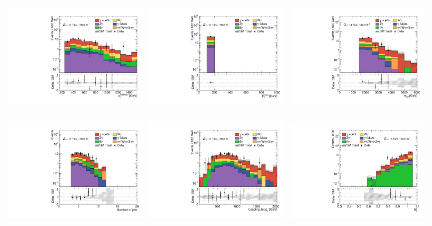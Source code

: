 \begin{figure}[ht!]
 \begin{center}

   \includegraphics[width=0.32\textwidth]{images_tmp/results/fr2/can_VRM2H_ph_pt0_afterFit.pdf}
   \includegraphics[width=0.32\textwidth]{images_tmp/results/fr2/can_VRM2H_met_et_afterFit.pdf}
   \includegraphics[width=0.32\textwidth]{images_tmp/results/fr2/can_VRM2H_meff_afterFit.pdf}

   \includegraphics[width=0.32\textwidth]{images_tmp/results/fr2/can_VRM2H_jet_n_afterFit}
   \includegraphics[width=0.32\textwidth]{images_tmp/results/fr2/can_VRM2H_jet_pt0_afterFit.pdf}
   \includegraphics[width=0.32\textwidth]{images_tmp/results/fr2/can_VRM2H_rt4_afterFit}


\end{center}
\end{figure}
